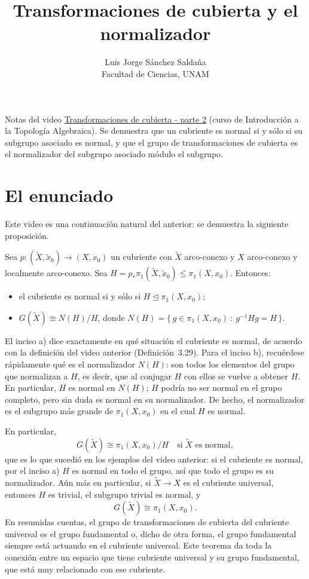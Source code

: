 \documentclass[11pt]{article}
\title{Transformaciones de cubierta y el normalizador}
\author{Luis Jorge Sánchez Saldaña\\[2pt]\small Facultad de Ciencias, UNAM}
\date{}
\begin{document}
\maketitle

\noindent\small Notas del video
\href{https://www.youtube.com/watch?v=XOkWZ8YTgFw}{\guillemotleft{}Transformaciones de cubierta - parte 2\guillemotright{}}
(curso de Introducción a la Topología Algebraica). Se demuestra que un cubriente es normal si y sólo si su subgrupo asociado es normal, y que el grupo de transformaciones de cubierta es el normalizador del subgrupo asociado módulo el subgrupo.
\normalsize

\section*{El enunciado}

Este video es una continuación natural del anterior: se demuestra la siguiente proposición.

\begin{prop}\label{prop:normalizador}
Sea $p\colon(\tilde X,\tilde x_0)\to(X,x_0)$ un cubriente con $\tilde X$ arco-conexo y $X$ arco-conexo y localmente arco-conexo. Sea $H=p_*\pi_1(\tilde X,\tilde x_0)\le\pi_1(X,x_0)$. Entonces:
\begin{itemize}
  \item[a)] el cubriente es normal si y sólo si $H\trianglelefteq\pi_1(X,x_0)$;
  \item[b)] $G(\tilde X)\cong N(H)/H$, donde $N(H)=\{\,g\in\pi_1(X,x_0)\ :\ g^{-1}Hg=H\,\}$.
\end{itemize}
\end{prop}

El inciso a) dice exactamente en qué situación el cubriente es normal, de acuerdo con la definición del video anterior (Definición~3.29). Para el inciso b), recuérdese rápidamente qué es el normalizador $N(H)$: son todos los elementos del grupo que normalizan a $H$, es decir, que al conjugar $H$ con ellos se vuelve a obtener $H$. En particular, $H$ es normal en $N(H)$; $H$ podría no ser normal en el grupo completo, pero sin duda es normal en su normalizador. De hecho, el normalizador es el subgrupo más grande de $\pi_1(X,x_0)$ en el cual $H$ es normal.

En particular,
\[
  G(\tilde X)\cong\pi_1(X,x_0)/H\quad\text{si }\tilde X\text{ es normal},
\]
que es lo que sucedió en los ejemplos del video anterior: si el cubriente es normal, por el inciso a) $H$ es normal en todo el grupo, así que todo el grupo es su normalizador. Aún más en particular, si $\tilde X\to X$ es el cubriente universal, entonces $H$ es trivial, el subgrupo trivial es normal, y
\[
  G(\tilde X)\cong\pi_1(X,x_0) .
\]
En resumidas cuentas, el grupo de transformaciones de cubierta del cubriente universal es el grupo fundamental o, dicho de otra forma, el grupo fundamental siempre está actuando en el cubriente universal. Este teorema da toda la conexión entre un espacio que tiene cubriente universal y su grupo fundamental, que está muy relacionado con ese cubriente.
\end{document}
